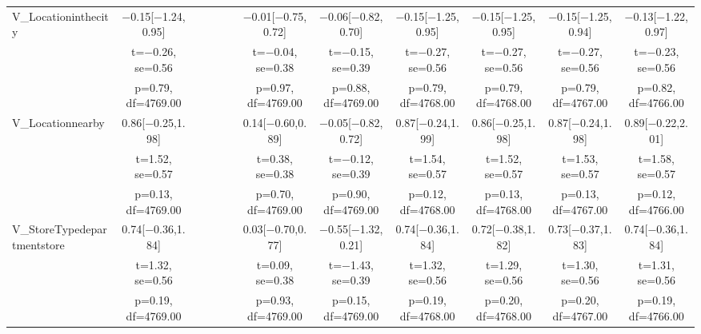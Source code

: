 \documentclass[]{report}
\begin{document}
\begin{table}
{\begin{tabular}[t]{lccccccccccc}
		V\_Locationinthecity & \num{-0.15}[\num{-1.24},\num{0.95}] &  &  &  &  & \num{-0.01}[\num{-0.75},\num{0.72}] & \num{-0.06}[\num{-0.82},\num{0.70}] & \num{-0.15}[\num{-1.25},\num{0.95}] & \num{-0.15}[\num{-1.25},\num{0.95}] & \num{-0.15}[\num{-1.25},\num{0.94}] & \num{-0.13}[\num{-1.22},\num{0.97}]\\
		& t=\num{-0.26}, se=\num{0.56} &  &  &  &  & t=\num{-0.04}, se=\num{0.38} & t=\num{-0.15}, se=\num{0.39} & t=\num{-0.27}, se=\num{0.56} & t=\num{-0.27}, se=\num{0.56} & t=\num{-0.27}, se=\num{0.56} & t=\num{-0.23}, se=\num{0.56}\\
		& p=\num{0.79}, df=\num{4769.00} &  &  &  &  & p=\num{0.97}, df=\num{4769.00} & p=\num{0.88}, df=\num{4769.00} & p=\num{0.79}, df=\num{4768.00} & p=\num{0.79}, df=\num{4768.00} & p=\num{0.79}, df=\num{4767.00} & p=\num{0.82}, df=\num{4766.00}\\
		V\_Locationnearby & \num{0.86}[\num{-0.25},\num{1.98}] &  &  &  &  & \num{0.14}[\num{-0.60},\num{0.89}] & \num{-0.05}[\num{-0.82},\num{0.72}] & \num{0.87}[\num{-0.24},\num{1.99}] & \num{0.86}[\num{-0.25},\num{1.98}] & \num{0.87}[\num{-0.24},\num{1.98}] & \num{0.89}[\num{-0.22},\num{2.01}]\\
		& t=\num{1.52}, se=\num{0.57} &  &  &  &  & t=\num{0.38}, se=\num{0.38} & t=\num{-0.12}, se=\num{0.39} & t=\num{1.54}, se=\num{0.57} & t=\num{1.52}, se=\num{0.57} & t=\num{1.53}, se=\num{0.57} & t=\num{1.58}, se=\num{0.57}\\
		& p=\num{0.13}, df=\num{4769.00} &  &  &  &  & p=\num{0.70}, df=\num{4769.00} & p=\num{0.90}, df=\num{4769.00} & p=\num{0.12}, df=\num{4768.00} & p=\num{0.13}, df=\num{4768.00} & p=\num{0.13}, df=\num{4767.00} & p=\num{0.12}, df=\num{4766.00}\\
		V\_StoreTypedepartmentstore & \num{0.74}[\num{-0.36},\num{1.84}] &  &  &  &  & \num{0.03}[\num{-0.70},\num{0.77}] & \num{-0.55}[\num{-1.32},\num{0.21}] & \num{0.74}[\num{-0.36},\num{1.84}] & \num{0.72}[\num{-0.38},\num{1.82}] & \num{0.73}[\num{-0.37},\num{1.83}] & \num{0.74}[\num{-0.36},\num{1.84}]\\
		& t=\num{1.32}, se=\num{0.56} &  &  &  &  & t=\num{0.09}, se=\num{0.38} & t=\num{-1.43}, se=\num{0.39} & t=\num{1.32}, se=\num{0.56} & t=\num{1.29}, se=\num{0.56} & t=\num{1.30}, se=\num{0.56} & t=\num{1.31}, se=\num{0.56}\\
		& p=\num{0.19}, df=\num{4769.00} &  &  &  &  & p=\num{0.93}, df=\num{4769.00} & p=\num{0.15}, df=\num{4769.00} & p=\num{0.19}, df=\num{4768.00} & p=\num{0.20}, df=\num{4768.00} & p=\num{0.20}, df=\num{4767.00} & p=\num{0.19}, df=\num{4766.00}\\

\end{tabular}}
\end{table}
\end{document}

